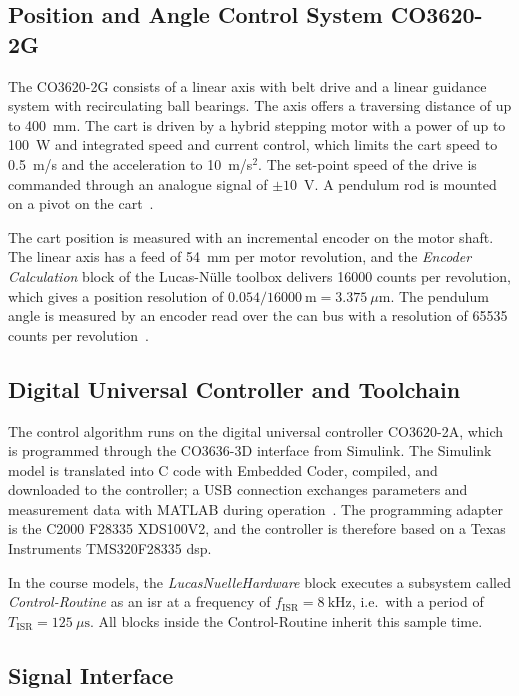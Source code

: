 \subsection{Position and Angle Control System CO3620-2G}
\label{subsec:co3620-2g}

The CO3620-2G consists of a linear axis with belt drive and a linear guidance
system with recirculating ball bearings. The axis offers a traversing distance
of up to 400~mm. The cart is driven by a hybrid stepping motor with a power of
up to 100~W and integrated speed and current control, which limits the cart
speed to 0.5~m/s and the acceleration to 10~m/s$^2$. The set-point speed of the
drive is commanded through an analogue signal of $\pm 10$~V. A pendulum rod is
mounted on a pivot on the cart~\cite{ln_manual}.

The cart position is measured with an incremental encoder on the motor shaft.
The linear axis has a feed of 54~mm per motor revolution, and the
\emph{Encoder Calculation} block of the Lucas-Nülle toolbox delivers 16000
counts per revolution, which gives a position resolution of
$0.054/16000~\mathrm{m} = 3.375~\mu\mathrm{m}$. The pendulum angle is measured
by an encoder read over the \acf{can} bus with a
resolution of 65535 counts per revolution~\cite{ln_manual}.

\subsection{Digital Universal Controller and Toolchain}
\label{subsec:co3620-2a}

The control algorithm runs on the digital universal controller CO3620-2A,
which is programmed through the CO3636-3D interface from Simulink. The
Simulink model is translated into C code with Embedded Coder, compiled, and
downloaded to the controller; a USB connection exchanges parameters and
measurement data with MATLAB during operation~\cite{ln_manual}. The programming
adapter is the C2000 F28335 XDS100V2, and the controller is therefore based on
a Texas Instruments TMS320F28335 \acf{dsp}.

In the course models, the \emph{LucasNuelleHardware} block executes a
subsystem called \emph{Control-Routine} as an \acf{isr} at a frequency of $f_{\mathrm{ISR}} = 8~\mathrm{kHz}$, i.e.\ with a
period of $T_{\mathrm{ISR}} = 125~\mu\mathrm{s}$. All blocks inside the
Control-Routine inherit this sample time.

\subsection{Signal Interface}
\label{subsec:signals}

